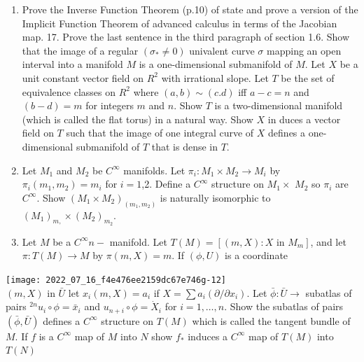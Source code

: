 \documentclass[10pt]{article}
\begin{document}
\begin{enumerate}
  \item Prove the Inverse Function Theorem (p.10) of state and prove a version of the Implicit Function Theorem of advanced calculus in terms of the Jacobian map. 17. Prove the last sentence in the third paragraph of section 1.6. Show that the image of a regular $\left(\sigma_{*} \neq 0\right)$ univalent curve $\sigma$ mapping an open interval into a manifold $M$ is a one-dimensional submanifold of $M$. Let $X$ be a unit constant vector field on $R^{2}$ with irrational slope. Let $T$ be the set of equivalence classes on $R^{2}$ where $(a, b) \sim(c . d)$ iff $a-c=n$ and $(b-d)=m$ for integers $m$ and $n .$ Show $T$ is a two-dimensional manifold (which is called the flat torus) in a natural way. Show $X$ in duces a vector field on $T$ such that the image of one integral curve of $X$ defines a one-dimensional submanifold of $T$ that is dense in $T .$

  \item Let $M_{1}$ and $M_{2}$ be $C^{\infty}$ manifolds. Let $\pi_{i}: M_{1} \times M_{2} \rightarrow M_{i}$ by $\pi_{i}\left(m_{1}, m_{2}\right)=m_{i}$ for $i=1$,2. Define a $C^{\infty}$ structure on $M_{1} \times$ $M_{2}$ so $\pi_{i}$ are $C^{\infty} .$ Show $\left(M_{1} \times M_{2}\right)_{\left(m_{1}, m_{2}\right)}$ is naturally isomorphic to $\left(M_{1}\right)_{m,} \times\left(M_{2}\right)_{m_{2}}$.

  \item Let $M$ be a $C^{\infty} n-$ manifold. Let $T(M)=\left[(m, X): X\right.$ in $\left.M_{m}\right]$, and let $\pi: T(M) \rightarrow M$ by $\pi(m, X)=m .$ If $(\phi, U)$ is a coordinate

\end{enumerate}
\texttt{[image: 2022\_07\_16\_f4e476ee2159dc67e746g-12]}\\
$(m, X)$ in $\bar{U}$ let $x_{i}(m, X)=a_{i}$ if $X=\sum a_{i}\left(\partial / \partial x_{i}\right)$. Let $\bar{\phi}: \bar{U} \rightarrow$ subatlas of pairs ${ }^{2 n} u_{i} \circ \phi=\bar{x}_{i}$ and $u_{n+i} \circ \phi=\dot{X}_{i}$ for $i=1, \ldots, n$. Show the subatlas of pairs $(\bar{\phi}, \bar{U})$ defines a $C^{\infty}$ structure on $T(M)$ which is called the tangent bundle of $M$. If $f$ is a $C^{\infty}$ map of $M$ into $N$ show $f_{*}$ induces a $C^{\infty}$ map of $T(M)$ into $T(N)$
\end{document}
